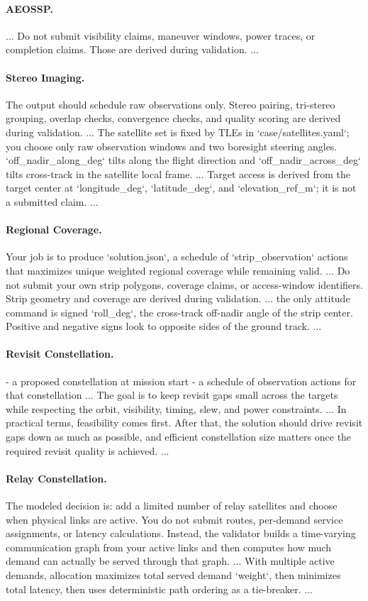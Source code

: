 \documentclass[]{mosi}
\newenvironment{promptblockcompact}
  {\VerbatimEnvironment\par\smallskip\Needspace{6\baselineskip}\noindent\begin{promptblockinnercompact}}
  {\end{promptblockinnercompact}\par\smallskip}
\newcommand{\promptheadingcompact}[1]{\Needspace{4\baselineskip}\paragraph{#1}\mbox{}\par}
\begin{document}
\promptheadingcompact{AEOSSP.}
\begin{promptblockcompact}
...
Do not submit visibility claims, maneuver windows, power traces, or completion
claims.
Those are derived during validation.
...
\end{promptblockcompact}

\promptheadingcompact{Stereo Imaging.}
\begin{promptblockcompact}
The output should schedule raw observations only. Stereo pairing,
tri-stereo grouping, overlap checks, convergence checks, and quality scoring
are derived during validation.
...
The satellite set is fixed by TLEs in `case/satellites.yaml`; you choose only
raw observation windows and two boresight steering angles.
`off_nadir_along_deg` tilts along the flight direction and
`off_nadir_across_deg` tilts cross-track in the satellite local frame.
...
Target access is derived from the target center at `longitude_deg`,
`latitude_deg`, and `elevation_ref_m`; it is not a submitted claim.
...
\end{promptblockcompact}

\promptheadingcompact{Regional Coverage.}
\begin{promptblockcompact}
Your job is to produce `solution.json`, a schedule of `strip_observation`
actions that maximizes unique weighted regional coverage while remaining valid.
...
Do not submit your own strip polygons, coverage claims, or access-window
identifiers. Strip geometry and coverage are derived during validation.
...
the only attitude command is signed `roll_deg`, the cross-track off-nadir
angle of the strip center. Positive and negative signs look to opposite sides
of the ground track.
...
\end{promptblockcompact}

\promptheadingcompact{Revisit Constellation.}
\begin{promptblockcompact}
- a proposed constellation at mission start
- a schedule of observation actions for that constellation
...
The goal is to keep revisit gaps small across the targets while respecting the
orbit, visibility, timing, slew, and power constraints.
...
In practical terms, feasibility comes first. After that, the solution should
drive revisit gaps down as much as possible, and efficient constellation size
matters once the required revisit quality is achieved.
...
\end{promptblockcompact}

\promptheadingcompact{Relay Constellation.}
\begin{promptblockcompact}
The modeled decision is: add a limited number of relay satellites and choose
when physical links are active. You do not submit routes, per-demand service
assignments, or latency calculations. Instead, the validator builds a
time-varying communication graph from your active links and then computes how
much demand can actually be served through that graph.
...
With multiple active demands, allocation maximizes total served demand
`weight`, then minimizes total latency, then uses deterministic path ordering
as a tie-breaker.
...
\end{promptblockcompact}
\end{document}
